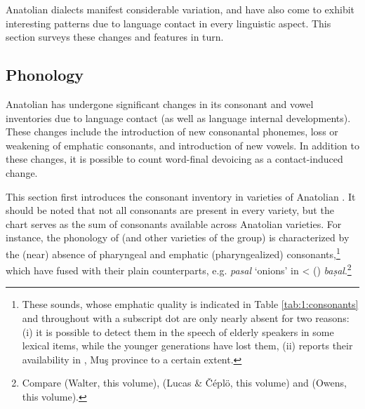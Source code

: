 \documentclass[output=paper]{langsci/langscibook}
\begin{document}
Anatolian  dialects manifest considerable variation, and have also come to exhibit interesting patterns due to language contact in every linguistic aspect. This section surveys these changes and features in turn.

\subsection{Phonology}

Anatolian  has undergone significant changes in its consonant and vowel inventories due to language contact (as well as language internal developments). These changes include the introduction of new consonantal phonemes, loss or weakening of {emphatic consonants}, and introduction of new vowels. In addition to these changes, it is possible to count word-final {devoicing} as a contact-induced change.

This section first introduces the consonant inventory in varieties of Anatolian . It should be noted that not all consonants are present in every variety, but the chart serves as the sum of consonants available across Anatolian  varieties. For instance, the phonology of   (and other varieties of the  group) is characterized by the (near) absence of {pharyngeal} and {emphatic} ({pharyngealized}) consonants,\footnote{These sounds, whose {emphatic} quality is indicated in Table \ref{tab:1:consonants} and throughout with a subscript dot are only nearly absent for two reasons: (i) it is possible to detect them in the speech of elderly speakers in some lexical items, while the younger generations have lost them, (ii) \cite{Talay2001} reports their availability in , Muş province to a certain extent.} which have fused with their plain counterparts, e.g. \textit{pasal} `onions' in
 <  () \textit{baṣal}.\footnote{Compare   (Walter, this volume),  (Lucas \& Čéplö, this volume) and   (Owens, this volume).}
\end{document}
